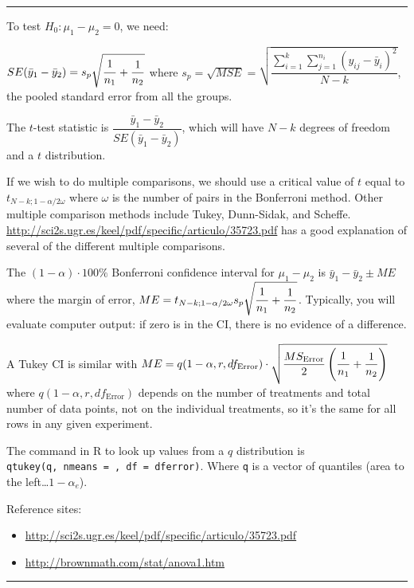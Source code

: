\documentclass[
]{article}
\begin{document}
\begin{center}\rule{0.5\linewidth}{0.5pt}\end{center}

To test \(H_0: \mu_1 - \mu_2 = 0\), we need:

\(SE(\bar{y}_1-\bar{y}_2) = s_p \sqrt{\dfrac{\strut 1}{n_1}+\dfrac{1}{n_2}}\) where \(s_p = \sqrt{MSE}= \sqrt{\dfrac{\sum_{i=1}^{k} \sum_{j=1}^{n_i} (y_{ij} - \bar{y}_i)^2}{N-k}}\), the pooled standard error from all the groups.

The \(t\)-test statistic is \(\dfrac{\bar{y}_1 - \bar{y}_2}{SE(\bar{y}_1-\bar{y}_2)}\), which will have \(N-k\) degrees of freedom and a \(t\) distribution.

If we wish to do multiple comparisons, we should use a critical value of \(t\) equal to \(t_{N-k; 1-\alpha/2\omega}\) where \(\omega\) is the number of pairs in the Bonferroni method. Other multiple comparison methods include Tukey, Dunn-Sidak, and Scheffe. \url{http://sci2s.ugr.es/keel/pdf/specific/articulo/35723.pdf} has a good explanation of several of the different multiple comparisons.

The \((1-\alpha)\cdot 100\%\) Bonferroni confidence interval for \(\mu_1-\mu_2\) is \(\bar{y}_1 - \bar{y}_2 \pm ME\) where the margin of error, \(ME= t_{N-k; 1-\alpha/2\omega} s_p \sqrt{\dfrac{\strut 1}{n_1}+\dfrac{1}{n_2}}\). Typically, you will evaluate computer output: if zero is in the CI, there is no evidence of a difference.

A Tukey CI is similar with \(ME = q(1-\alpha,r,df_\text{Error}) \cdot \sqrt{\dfrac{MS_\text{Error}}{2}\left( \dfrac{\strut 1}{n_1}+\dfrac{1}{n_2} \right)}\) where
\(q(1-\alpha,r,df_\text{Error})\) depends on the number of treatments and total number of data points, not on the individual treatments, so it's the same for all rows in any given experiment.

The command in R to look up values from a \(q\) distribution is \texttt{qtukey(q,\ nmeans\ =\ ,\ df\ =\ dferror)}. Where \texttt{q} is a vector of quantiles (area to the left\ldots{}\(1-\alpha_e\)).

Reference sites:

\begin{itemize}
\item
  \url{http://sci2s.ugr.es/keel/pdf/specific/articulo/35723.pdf}
\item
  \url{http://brownmath.com/stat/anova1.htm}
\end{itemize}

\begin{center}\rule{0.5\linewidth}{0.5pt}\end{center}
\end{document}
